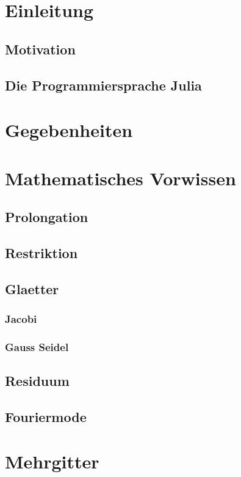 \documentclass[a4paper, 11pt]{article}
\begin{document}
    \tableofcontents

    \newpage

    \section{Einleitung}
        \subsection{Motivation}
        \subsection{Die Programmiersprache Julia}
    \section{Gegebenheiten}
    \section{Mathematisches Vorwissen}
            \subsection{Prolongation}
            \subsection{Restriktion}
            \subsection{Glaetter}
                \subsubsection{Jacobi}
                \subsubsection{Gauss Seidel}
            \subsection{Residuum}
            \subsection{Fouriermode}
    \section{Mehrgitter}
\end{document}
